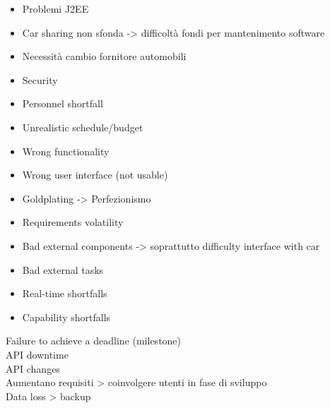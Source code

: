 \begin{itemize}
\item Problemi J2EE
\item Car sharing non sfonda -> difficoltà fondi per mantenimento software
\item Necessità cambio fornitore automobili
\item Security
\item Personnel shortfall
\item Unrealistic schedule/budget
\item Wrong functionality
\item Wrong user interface (not usable)
\item Goldplating -> Perfezionismo
\item Requirements volatility
\item Bad external components -> soprattutto difficulty interface with car
\item Bad external tasks
\item Real-time shortfalls
\item Capability shortfalls
\end{itemize}
Failure to achieve a deadline (milestone)\\
API downtime\\
API changes\\
Aumentano requisiti > coinvolgere utenti in fase di sviluppo\\
Data loss > backup

